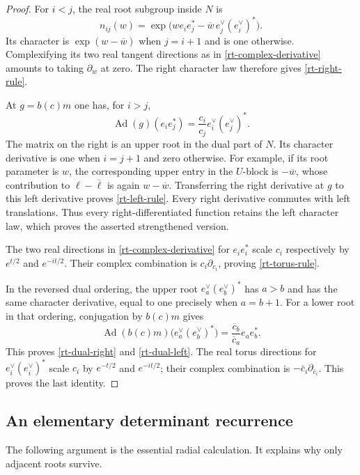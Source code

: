 \begin{proof}
For $i<j$, the real root subgroup inside $N$ is
\[
 n_{ij}(w)=
 \exp\bigl(w e_ie_j^*-\overline w\,
                         e_j^\vee(e_i^\vee)^*\bigr).
\]
Its character is $\exp(w-\overline w)$ when
$j=i+1$ and is one otherwise.
Complexifying its two real tangent directions as
in \eqref{rt-complex-derivative} amounts to taking
$\partial_w$ at zero.  The right character law
therefore gives \eqref{rt-right-rule}.

At $g=b(c)m$ one has, for $i>j$,
\[
 \operatorname{Ad}(g)(e_ie_j^*)
          =\frac{c_i}{c_j}
                      e_i^\vee(e_j^\vee)^*.
\]
The matrix on the right is an upper root in the
dual part of $N$.  Its character derivative is
one when $i=j+1$ and zero otherwise.  For example,
if its root parameter is $w$, the corresponding
upper entry in the $U$-block is $-\overline w$,
whose contribution to
$\ell-\overline\ell$ is again $w-\overline w$.
Transferring the right derivative at $g$ to this
left derivative proves \eqref{rt-left-rule}.
Every right derivative commutes with left
translations.  Thus every right-differentiated
function retains the left character law, which
proves the asserted strengthened version.

The two real directions in
\eqref{rt-complex-derivative} for $e_ie_i^*$
scale $c_i$ respectively by $e^{t/2}$ and
$e^{-it/2}$.  Their complex combination is
$c_i\partial_{c_i}$, proving \eqref{rt-torus-rule}.

In the reversed dual ordering, the upper root
$e_a^\vee(e_b^\vee)^*$ has $a>b$ and has
the same character derivative, equal to one
precisely when $a=b+1$.  For a lower root in
that ordering, conjugation by $b(c)m$ gives
\[
 \operatorname{Ad}(b(c)m)
       \bigl(e_a^\vee(e_b^\vee)^*\bigr)
           =\frac{\overline c_b}{\overline c_a}
                          e_ae_b^* .
\]
This proves \eqref{rt-dual-right} and
\eqref{rt-dual-left}.  The real torus directions
for $e_i^\vee(e_i^\vee)^*$ scale $c_i$ by
$e^{-t/2}$ and $e^{-it/2}$; their complex
combination is $-\bar c_i\partial_{\bar c_i}$.
This proves the last identity.
\end{proof}

\subsection{An elementary determinant recurrence}

The following argument is the essential radial calculation.
It explains why only adjacent roots survive.

